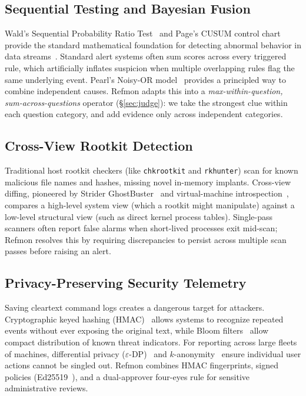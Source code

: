 \documentclass[10pt,twocolumn,letterpaper]{article}
\makeatletter
\theoremstyle{plain}
\theoremstyle{definition}
\theoremstyle{remark}
\DeclareRobustCommand{\_}{\ifmmode\nfss@text{\textunderscore}\else\textunderscore\penalty\@highpenalty\hskip\z@skip\fi}
\makeatother
\begin{document}
\subsection{Sequential Testing and Bayesian Fusion}
Wald's Sequential Probability Ratio Test~\cite{wald1945sequential} and Page's CUSUM control chart~\cite{page1954continuous} provide the standard mathematical foundation for detecting abnormal behavior in data streams~\cite{jung2004fast}. Standard alert systems often sum scores across every triggered rule, which artificially inflates suspicion when multiple overlapping rules flag the same underlying event. Pearl's Noisy-OR model~\cite{pearl1988probabilistic} provides a principled way to combine independent causes. Refmon adapts this into a \emph{max-within-question, sum-across-questions} operator (\S\ref{sec:judge}): we take the strongest clue within each question category, and add evidence only across independent categories.

\subsection{Cross-View Rootkit Detection}
Traditional host rootkit checkers (like \texttt{chkrootkit} and \texttt{rkhunter}) scan for known malicious file names and hashes, missing novel in-memory implants. Cross-view diffing, pioneered by Strider GhostBuster~\cite{wang2005strider} and virtual-machine introspection~\cite{garfinkel2003virtual}, compares a high-level system view (which a rootkit might manipulate) against a low-level structural view (such as direct kernel process tables). Single-pass scanners often report false alarms when short-lived processes exit mid-scan; Refmon resolves this by requiring discrepancies to persist across multiple scan passes before raising an alert.

\subsection{Privacy-Preserving Security Telemetry}
Saving cleartext command logs creates a dangerous target for attackers. Cryptographic keyed hashing (HMAC)~\cite{bellare1996keying} allows systems to recognize repeated events without ever exposing the original text, while Bloom filters~\cite{bloom1970space} allow compact distribution of known threat indicators. For reporting across large fleets of machines, differential privacy ($\varepsilon$-DP)~\cite{dwork2006calibrating} and $k$-anonymity~\cite{sweeney2002kanonymity} ensure individual user actions cannot be singled out. Refmon combines HMAC fingerprints, signed policies (Ed25519~\cite{bernstein2012high}), and a dual-approver four-eyes rule for sensitive administrative reviews.
\end{document}
